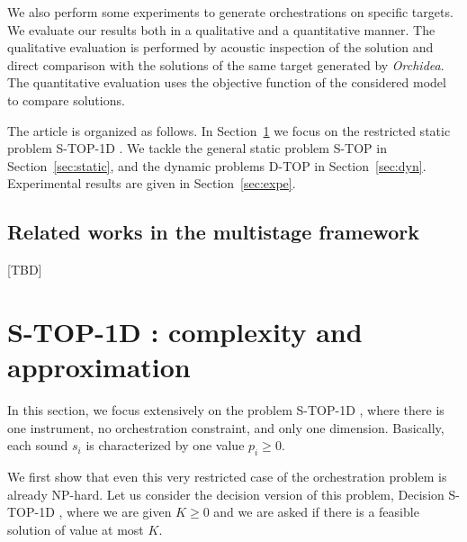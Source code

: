 \documentclass[a4paper]{book}
\newtheorem{definition}{Definition}
\newcommand{\stat}{{\sc S-TOP }}
\newcommand{\statoned}{{\sc S-TOP-1D }}
\newcommand{\dyn}{{\sc D-TOP }}
\begin{document}
We also perform some experiments to generate orchestrations on specific targets. We evaluate our results both in a qualitative and a quantitative manner. 
The qualitative evaluation is performed by acoustic inspection of the solution and direct comparison with the solutions of the same target generated by \textit{Orchidea}. The quantitative evaluation uses the objective function of the considered model to compare solutions.

The article is organized as follows. In Section~\ref{sec:1dnoc} we focus on the restricted static problem \statoned. We tackle the general static problem \stat in Section~\ref{sec:static}, and the dynamic problems \dyn in Section~\ref{sec:dyn}. Experimental results are given in Section~\ref{sec:expe}. 


\subsection{Related works in the {\sc multistage} framework}

[TBD] 






\section{\statoned: complexity and approximation}\label{sec:1dnoc}

In this section, we focus extensively on the problem \statoned, where there is one instrument, no orchestration constraint, and only one dimension. Basically, each sound $s_i$ is characterized by one value $p_i\geq 0$. 

We first show that even this very restricted case of the orchestration problem is already NP-hard. Let us consider the decision version of this problem, {\sc Decision} \statoned, where we are given $K\geq 0$ and we are asked if there is a feasible solution of value at most $K$. 



\end{document}
